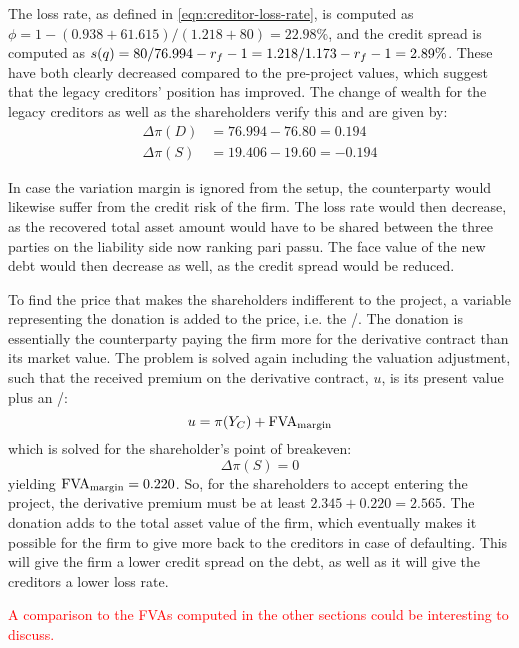 \documentclass[../main.tex]{subfiles}
\begin{document}
        The loss rate, as defined in \cref{eqn:creditor-loss-rate}, is computed as
        $\phi = 1-(0.938+61.615)/(1.218+80) = 22.98\%$,
        and the credit spread is computed as
        $s(q) = 80/76.994 - r_{f} - 1 = 1.218/1.173 - r_{f} - 1 = 2.89\%$. These have both clearly decreased compared to the pre-project values, which suggest that the legacy creditors' position has improved.
        The change of wealth for the legacy creditors as well as the shareholders verify this and are given by:
        \begin{align}
            \Delta \pi(D) &= 76.994 - 76.80 = 0.194\\
            \Delta \pi(S) &= 19.406 - 19.60 = -0.194
        \end{align}

        In case the variation margin is ignored from the setup, the counterparty would likewise suffer from the credit risk of the firm.
        The loss rate would then decrease,
        as the recovered total asset amount would have to be shared between the three parties on the liability side now ranking pari passu.
        The face value of the new debt would then decrease as well, as the credit spread would be reduced.

        To find the price that makes the shareholders indifferent to the project,
        a variable representing the donation is added to the price, i.e. the \MVA/.
        The donation is essentially the counterparty paying the firm more for the derivative contract than its market value.
        The problem is solved again including the valuation adjustment,
        such that the received premium on the derivative contract, $u$, is its present value plus an \MVA/:
        \begin{equation}
            u = \pi(Y_C) + \MVA/
        \end{equation}
        which is solved for the shareholder's point of breakeven:
        \begin{equation}
            \Delta \pi(S) = 0
        \end{equation}
        yielding $\MVA/ = 0.220$. So, for the shareholders to accept entering the project, the derivative premium must be at least $2.345 + 0.220 = 2.565$.
        The donation adds to the total asset value of the firm,
        which eventually makes it possible for the firm to give more back to the creditors in case of defaulting.
        This will give the firm a lower credit spread on the debt, as well as it will give the creditors a lower loss rate.

        \textcolor{red}{A comparison to the FVAs computed in the other sections could be interesting to discuss.}
        
\end{document}
